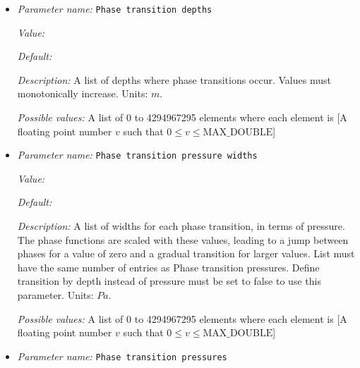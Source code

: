 \begin{itemize}
{\it Default:} 


{\it Description:} A list of density jumps at each phase transition. A positive value means that the density increases with depth. The corresponding entry in Corresponding phase for density jump determines if the density jump occurs in peridotite, eclogite or none of them.List must have the same number of entries as Phase transition depths. Units: $kg/m^3$.


{\it Possible values:} A list of 0 to 4294967295 elements where each element is [A floating point number $v$ such that $0 \leq v \leq \text{MAX\_DOUBLE}$]
\item {\it Parameter name:} {\tt Phase transition depths}
\label{parameters:Material model/Latent heat/Phase transition depths}


{\it Value:} 


{\it Default:} 


{\it Description:} A list of depths where phase transitions occur. Values must monotonically increase. Units: $m$.


{\it Possible values:} A list of 0 to 4294967295 elements where each element is [A floating point number $v$ such that $0 \leq v \leq \text{MAX\_DOUBLE}$]
\item {\it Parameter name:} {\tt Phase transition pressure widths}
\label{parameters:Material model/Latent heat/Phase transition pressure widths}


{\it Value:} 


{\it Default:} 


{\it Description:} A list of widths for each phase transition, in terms of pressure. The phase functions are scaled with these values, leading to a jump between phases for a value of zero and a gradual transition for larger values. List must have the same number of entries as Phase transition pressures. Define transition by depth instead of pressure must be set to false to use this parameter. Units: $Pa$.


{\it Possible values:} A list of 0 to 4294967295 elements where each element is [A floating point number $v$ such that $0 \leq v \leq \text{MAX\_DOUBLE}$]
\item {\it Parameter name:} {\tt Phase transition pressures}
\label{parameters:Material model/Latent heat/Phase transition pressures}



\end{itemize}
